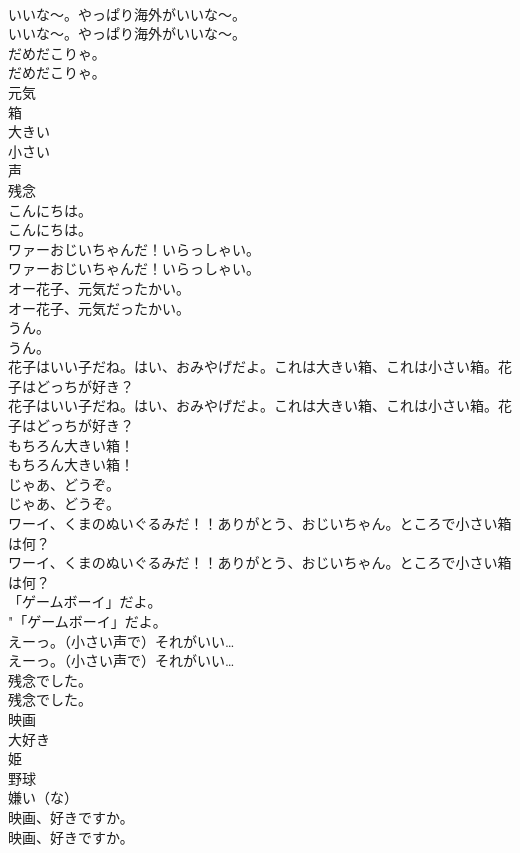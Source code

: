 \documentclass[8pt]{extreport}
\begin{document}
\begin{CJK}{UTF8}{min}
\\	いいな〜。やっぱり海外がいいな〜。	
\\	いいな〜。やっぱり海外がいいな〜。 
\\	だめだこりゃ。	
\\	だめだこりゃ。 
\\	元気
\\	箱
\\	大きい
\\	小さい
\\	声
\\	残念
\\	こんにちは。	
\\	こんにちは。 
\\	ワァーおじいちゃんだ！いらっしゃい。	
\\	ワァーおじいちゃんだ！いらっしゃい。 
\\	オー花子、元気だったかい。	
\\	オー花子、元気だったかい。 
\\	うん。	
\\	うん。 
\\	花子はいい子だね。はい、おみやげだよ。これは大きい箱、これは小さい箱。花子はどっちが好き？	
\\	花子はいい子だね。はい、おみやげだよ。これは大きい箱、これは小さい箱。花子はどっちが好き？ 
\\	もちろん大きい箱！	
\\	もちろん大きい箱！ 
\\	じゃあ、どうぞ。	
\\	じゃあ、どうぞ。 
\\	ワーイ、くまのぬいぐるみだ！！ありがとう、おじいちゃん。ところで小さい箱は何？	
\\	ワーイ、くまのぬいぐるみだ！！ありがとう、おじいちゃん。ところで小さい箱は何？ 
\\	「ゲームボーイ」だよ。	
\\	"「ゲームボーイ」だよ。 
\\	えーっ。（小さい声で）それがいい…	
\\	えーっ。（小さい声で）それがいい… 
\\	残念でした。	
\\	残念でした。 
\\	映画
\\	大好き
\\	姫
\\	野球
\\	嫌い（な）
\\	映画、好きですか。	
\\	映画、好きですか。 

\end{CJK}
\end{document}
